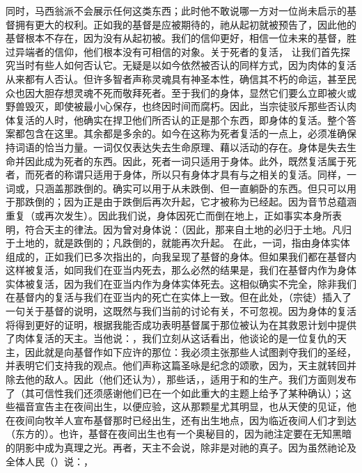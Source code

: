 同时，马西翁派不会展示任何这类东西；此时他不敢说哪一方对一位尚未启示的基督拥有更大的权利。正如我的基督是应被期待的，祂从起初就被预告了，因此他的基督根本不存在，因为没有从起初被。我们的信仰更好，相信一位未来的基督，胜过异端者的信仰，他们根本没有可相信的对象。关于死者的复活， 让我们首先探究当时有些人如何否认它。无疑是以如今依然被否认的同样方式，因为肉体的复活从来都有人否认。但许多智者声称灵魂具有神圣本性，确信其不朽的命运，甚至民众也因大胆存想灵魂不死而敬拜死者。至于我们的身体，显然它们要么立即被火或野兽毁灭，即使被最小心保存，也终因时间而腐朽。因此，当宗徒驳斥那些否认肉体复活的人时，他确实在捍卫他们所否认的正是那个东西，即身体的复活。整个答案都包含在这里。其余都是多余的。如今在这称为死者复活的一点上，必须准确保持词语的恰当力量。一词仅仅表达失去生命原理、藉以活动的存在。身体是失去生命并因此成为死者的东西。因此，死者一词只适用于身体。此外，既然复活属于死者，而死者的称谓只适用于身体，所以只有身体才具有与之相关的复活。同样，一词或，只涵盖那跌倒的。确实可以用于从未跌倒、但一直躺卧的东西。但只可以用于那跌倒的；因为正是由于跌倒后再次升起，它才被称为已经起。因为音节总蕴涵重复（或再次发生）。因此我们说，身体因死亡而倒在地上，正如事实本身所表明，符合天主的律法。因为曾对身体说：（因此，那来自土地的必归于土地。凡归于土地的，就是跌倒的；凡跌倒的，就能再次升起。 在此，一词，指由身体实体组成的，正如我们已多次指出的，向我呈现了基督的身体。但如果我们都在基督内这样被复活，如同我们在亚当内死去，那么必然的结果是，我们在基督内作为身体实体被复活，因为我们在亚当内作为身体实体死去。这相似确实不完全，除非我们在基督内的复活与我们在亚当内的死亡在实体上一致。但在此处，（宗徒）插入了一句关于基督的说明，这既然与我们当前的讨论有关，不可忽视。因为身体的复活将得到更好的证明，根据我能否成功表明基督属于那位被认为在其救恩计划中提供了肉体复活的天主。当他说：，我们立刻从这话看出，他谈论的是一位复仇的天主，因此就是向基督作如下应许的那位：我必须主张那些人试图剥夺我们的圣经，并表明它们支持我的观点。他们声称这篇圣咏是纪念的颂歌，因为，天主就转回并除去他的敌人。因此（他们还认为），那些话，，适用于和的生产。我们方面则发布了（其可信性我们还须感谢他们已在一个如此重大的主题上给予了某种确认）；这些福音宣告主在夜间出生，以便应验，这从那颗星尤其明显，也从天使的见证，他在夜间向牧羊人宣布基督那时已经出生，还有出生地点，因为临近夜间人们才到达（东方的）。也许，基督在夜间出生也有一个奥秘目的，因为祂注定要在无知黑暗的阴影中成为真理之光。再者，天主不会说，除非是对祂的真子。因为虽然祂论及全体人民（）说：， 